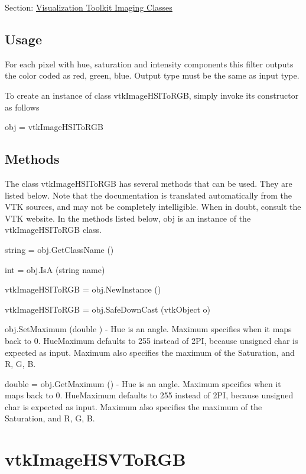 Section\-: \hyperlink{sec_vtkimaging}{Visualization Toolkit Imaging Classes} \hypertarget{vtkwidgets_vtkxyplotwidget_Usage}{}\subsection{Usage}\label{vtkwidgets_vtkxyplotwidget_Usage}
For each pixel with hue, saturation and intensity components this filter outputs the color coded as red, green, blue. Output type must be the same as input type.

To create an instance of class vtk\-Image\-H\-S\-I\-To\-R\-G\-B, simply invoke its constructor as follows \begin{DoxyVerb}  obj = vtkImageHSIToRGB
\end{DoxyVerb}
 \hypertarget{vtkwidgets_vtkxyplotwidget_Methods}{}\subsection{Methods}\label{vtkwidgets_vtkxyplotwidget_Methods}
The class vtk\-Image\-H\-S\-I\-To\-R\-G\-B has several methods that can be used. They are listed below. Note that the documentation is translated automatically from the V\-T\-K sources, and may not be completely intelligible. When in doubt, consult the V\-T\-K website. In the methods listed below, {\ttfamily obj} is an instance of the vtk\-Image\-H\-S\-I\-To\-R\-G\-B class. 
\begin{DoxyItemize}
\item {\ttfamily string = obj.\-Get\-Class\-Name ()}  
\item {\ttfamily int = obj.\-Is\-A (string name)}  
\item {\ttfamily vtk\-Image\-H\-S\-I\-To\-R\-G\-B = obj.\-New\-Instance ()}  
\item {\ttfamily vtk\-Image\-H\-S\-I\-To\-R\-G\-B = obj.\-Safe\-Down\-Cast (vtk\-Object o)}  
\item {\ttfamily obj.\-Set\-Maximum (double )} -\/ Hue is an angle. Maximum specifies when it maps back to 0. Hue\-Maximum defaults to 255 instead of 2\-P\-I, because unsigned char is expected as input. Maximum also specifies the maximum of the Saturation, and R, G, B.  
\item {\ttfamily double = obj.\-Get\-Maximum ()} -\/ Hue is an angle. Maximum specifies when it maps back to 0. Hue\-Maximum defaults to 255 instead of 2\-P\-I, because unsigned char is expected as input. Maximum also specifies the maximum of the Saturation, and R, G, B.  
\end{DoxyItemize}\hypertarget{vtkimaging_vtkimagehsvtorgb}{}\section{vtk\-Image\-H\-S\-V\-To\-R\-G\-B}\label{vtkimaging_vtkimagehsvtorgb}
